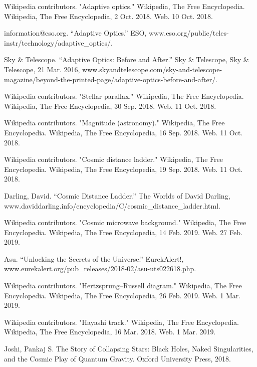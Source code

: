 \documentclass[a4paper,twoside,11pt]{article}
\numberwithin{equation}{section}
\begin{document}
\begin{thebibliography}{300}
Wikipedia contributors. "Adaptive optics." Wikipedia, The Free Encyclopedia. Wikipedia, The Free Encyclopedia, 2 Oct. 2018. Web. 10 Oct. 2018.

information@eso.org. “Adaptive Optics.” ESO, www.eso.org/public/teles-instr/technology/adaptive\_optics/. 

Sky $\&$ Telescope. “Adaptive Optics: Before and After.” Sky $\&$ Telescope, Sky $\&$ Telescope, 21 Mar. 2016, www.skyandtelescope.com/sky-and-telescope-magazine/beyond-the-printed-page/adaptive-optics-before-and-after/.

Wikipedia contributors. "Stellar parallax." Wikipedia, The Free Encyclopedia. Wikipedia, The Free Encyclopedia, 30 Sep. 2018. Web. 11 Oct. 2018.

Wikipedia contributors. "Magnitude (astronomy)." Wikipedia, The Free Encyclopedia. Wikipedia, The Free Encyclopedia, 16 Sep. 2018. Web. 11 Oct. 2018.

Wikipedia contributors. "Cosmic distance ladder." Wikipedia, The Free Encyclopedia. Wikipedia, The Free Encyclopedia, 19 Sep. 2018. Web. 11 Oct. 2018.

Darling, David. “Cosmic Distance Ladder.” The Worlds of David Darling, www.daviddarling.info/encyclopedia/C/cosmic\_distance\_ladder.html.

Wikipedia contributors. "Cosmic microwave background." Wikipedia, The Free Encyclopedia. Wikipedia, The Free Encyclopedia, 14 Feb. 2019. Web. 27 Feb. 2019.

Asu. “Unlocking the Secrets of the Universe.” EurekAlert!, www.eurekalert.org/pub\_releases/2018-02/asu-uts022618.php.

Wikipedia contributors. "Hertzsprung–Russell diagram." Wikipedia, The Free Encyclopedia. Wikipedia, The Free Encyclopedia, 26 Feb. 2019. Web. 1 Mar. 2019.

Wikipedia contributors. "Hayashi track." Wikipedia, The Free Encyclopedia. Wikipedia, The Free Encyclopedia, 16 Mar. 2018. Web. 1 Mar. 2019.

Joshi, Pankaj S. The Story of Collapsing Stars: Black Holes, Naked Singularities, and the Cosmic Play of Quantum Gravity. Oxford University Press, 2018.


\end{thebibliography}
\end{document}
